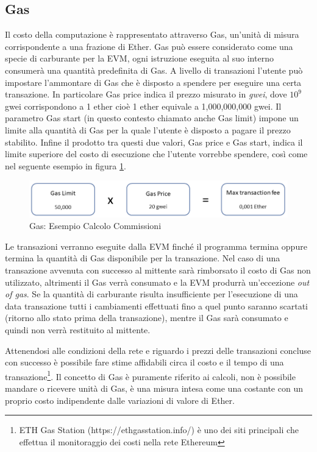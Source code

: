 \subsection{Gas}

Il costo della computazione è rappresentato attraverso Gas, un’unità di misura corrispondente a una frazione di Ether. Gas può essere considerato come una specie di carburante per la EVM, ogni istruzione eseguita al suo interno consumerà una quantità predefinita di Gas. A livello di transazioni l’utente può impostare l’ammontare di Gas che è disposto a spendere per eseguire una certa transazione. In particolare Gas price indica il prezzo misurato in \emph{gwei}, dove \(10^{9}\) gwei corrispondono a 1 ether cioè 1 ether equivale a 1,000,000,000 gwei. Il parametro Gas start (in questo contesto chiamato anche Gas limit) impone un limite alla quantità di Gas per la quale l’utente è disposto a pagare il prezzo stabilito.
Infine il prodotto tra questi due valori, Gas price e Gas start, indica il limite superiore del costo di esecuzione che l’utente vorrebbe spendere, così come nel seguente esempio in figura \ref{fig:GasEth}.

\begin{figure}[H]
\centering
\includegraphics[width=1\textwidth]{immagini/gas.png}
\caption{Gas: Esempio Calcolo Commissioni}
\label{fig:GasEth}
\end{figure}

Le transazioni verranno eseguite dalla EVM finché il programma termina oppure termina la quantità di Gas disponibile per la transazione. Nel caso di una transazione avvenuta con successo al mittente sarà rimborsato il costo di Gas non utilizzato, altrimenti il Gas verrà consumato e la EVM produrrà un'eccezione \emph{out of gas}. Se la quantità di carburante risulta insufficiente per l'esecuzione di una data transazione tutti i cambiamenti effettuati fino a quel punto saranno scartati (ritorno allo stato prima della transazione), mentre il Gas sarà consumato e quindi non verrà restituito al mittente.

Attenendosi alle condizioni della rete e riguardo i prezzi delle transazioni concluse con successo è possibile fare stime affidabili circa il costo e il tempo di una transazione\footnote{ETH Gas Station (https://ethgasstation.info/) è uno dei siti principali che effettua il monitoraggio dei costi nella rete Ethereum}. Il concetto di Gas è puramente riferito ai calcoli, non è possibile mandare o ricevere unità di Gas, è una misura intesa come una costante con un proprio costo indipendente dalle variazioni di valore di Ether.

